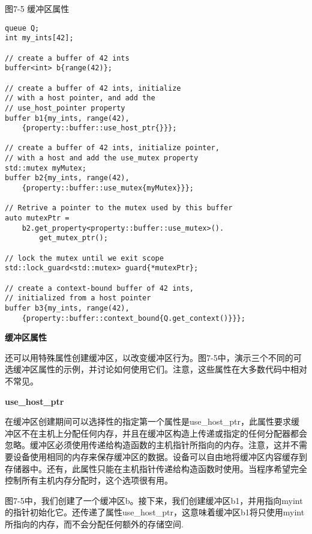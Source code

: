 \hspace*{\fill} \par %
图7-5 缓冲区属性
\begin{lstlisting}[caption={}]
queue Q;
int my_ints[42];

// create a buffer of 42 ints
buffer<int> b{range(42)};

// create a buffer of 42 ints, initialize 
// with a host pointer, and add the 
// use_host_pointer property
buffer b1{my_ints, range(42),
	{property::buffer::use_host_ptr{}}};

// create a buffer of 42 ints, initialize pointer,
// with a host and add the use_mutex property
std::mutex myMutex;
buffer b2{my_ints, range(42), 
	{property::buffer::use_mutex{myMutex}}};

// Retrive a pointer to the mutex used by this buffer
auto mutexPtr =
	b2.get_property<property::buffer::use_mutex>().
		get_mutex_ptr();
		
// lock the mutex until we exit scope
std::lock_guard<std::mutex> guard{*mutexPtr};

// create a context-bound buffer of 42 ints, 
// initialized from a host pointer
buffer b3{my_ints, range(42), 
	{property::buffer::context_bound{Q.get_context()}}};
\end{lstlisting}

\hspace*{\fill} \par %
\textbf{缓冲区属性}

还可以用特殊属性创建缓冲区，以改变缓冲区行为。图7-5中，演示三个不同的可选缓冲区属性的示例，并讨论如何使用它们。注意，这些属性在大多数代码中相对不常见。\par

\hspace*{\fill} \par %
\textbf{use\_host\_ptr}

在缓冲区创建期间可以选择性的指定第一个属性是use\_host\_ptr，此属性要求缓冲区不在主机上分配任何内存，并且在缓冲区构造上传递或指定的任何分配器都会忽略。缓冲区必须使用传递给构造函数的主机指针所指向的内存。注意，这并不需要设备使用相同的内存来保存缓冲区的数据。设备可以自由地将缓冲区内容缓存到存储器中。还有，此属性只能在主机指针传递给构造函数时使用。当程序希望完全控制所有主机内存分配时，这个选项很有用。\par

图7-5中，我们创建了一个缓冲区b。接下来，我们创建缓冲区b1，并用指向myint的指针初始化它。还传递了属性use\_host\_ptr，这意味着缓冲区b1将只使用myint所指向的内存，而不会分配任何额外的存储空间.\par

